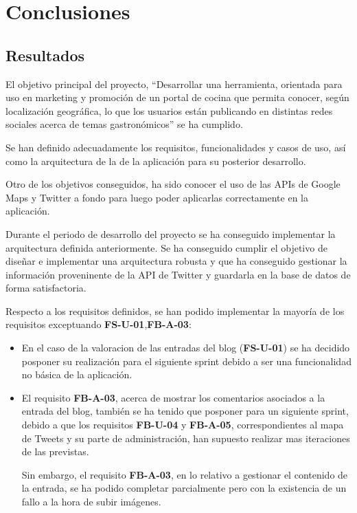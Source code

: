 \chapter{Conclusiones}

\section{Resultados}

El objetivo principal del proyecto, ``Desarrollar una herramienta, orientada para uso en marketing y promoción de un portal de cocina que permita conocer, según localización geográfica, lo que los usuarios están publicando en distintas redes sociales acerca de temas gastronómicos'' se ha cumplido.

Se han definido adecuadamente los requisitos, funcionalidades y casos de uso, así como la arquitectura de la de la aplicación para su posterior desarrollo.

Otro de los objetivos conseguidos, ha sido conocer el uso de las APIs de Google Maps y Twitter a fondo para luego poder aplicarlas correctamente en la aplicación.

Durante el periodo de desarrollo del proyecto se ha conseguido implementar la arquitectura definida anteriormente. Se ha conseguido cumplir el objetivo de diseñar e implementar una arquitectura robusta y que ha conseguido gestionar la información proveninente de la API de Twitter y guardarla en la base de datos de forma satisfactoria.

Respecto a los requisitos definidos, se han podido implementar la mayoría de los requisitos exceptuando \textbf{FS-U-01},\textbf{FB-A-03}:

\begin{itemize}
\item En el caso de la valoracion de las entradas del blog (\textbf{FS-U-01}) se ha decidido posponer su realización para el siguiente sprint debido a ser una funcionalidad no básica de la aplicación.

\item El requisito \textbf{FB-A-03}, acerca de mostrar los comentarios asociados a la entrada del blog, también se ha tenido que posponer para un siguiente sprint, debido a que los requisitos \textbf{FB-U-04} y \textbf{FB-A-05}, correspondientes
al mapa de Tweets y su parte de administración, han supuesto realizar mas iteraciones de las previstas.

Sin embargo, el requisito \textbf{FB-A-03}, en lo relativo a gestionar el contenido de la entrada, se ha podido completar parcialmente pero con la existencia de un fallo a la hora de subir imágenes.

\end{itemize}

